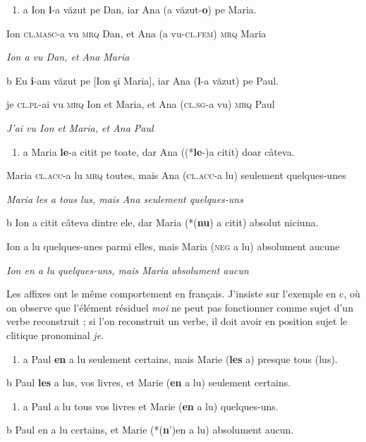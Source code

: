 \begin{enumerate}
\item \label{bkm:Ref289809725}a  Ion \textbf{l}-a văzut pe Dan, iar Ana (a văzut-\textbf{o}) pe Maria.


\end{enumerate}
Ion \textsc{cl.masc-}a vu \textsc{mrq} Dan, et Ana (a vu-\textsc{cl.fem) mrq} Maria

{\itshape
Ion a vu Dan, et Ana Maria}

  b  Eu \textbf{i}-am văzut pe [Ion şi Maria], iar Ana (\textbf{l}-a văzut) pe Paul.

    je \textsc{cl.pl-}ai vu \textsc{mrq} Ion et Maria, et Ana (\textsc{cl.sg}-a vu\textsc{) mrq} Paul

{\itshape
J'ai vu Ion et Maria, et Ana Paul}


\begin{enumerate}
\item \label{bkm:Ref289809793}a  Maria \textbf{le}-a citit pe toate, dar Ana ((*\textbf{le}-)a citit) doar câteva.


\end{enumerate}
Maria \textsc{cl.acc-}a lu \textsc{mrq} toutes, mais Ana (\textsc{cl.acc-}a lu) seulement quelques-unes

{\itshape
Maria les a tous lus, mais Ana seulement quelques-uns}

  b  Ion a citit câteva dintre ele, dar Maria (*(\textbf{nu}) a citit) absolut niciuna.

    Ion a lu quelques-unes parmi elles, mais Maria (\textsc{neg} a lu) absolument aucune

{\itshape
Ion en a lu quelques-uns, mais Maria absolument aucun} 

Les affixes ont le même comportement en français. J'insiste sur l'exemple en c, où on observe que l'élément résiduel \textit{moi} ne peut pas fonctionner comme sujet d'un verbe reconstruit ; si l'on reconstruit un verbe, il doit avoir en position sujet le clitique pronominal \textit{je}.


\begin{enumerate}
\item a   Paul \textbf{en} a lu seulement certains, mais Marie (\textbf{les} a) presque tous (lus).      


\end{enumerate}
b  Paul \textbf{les} a lus, vos livres, et Marie (\textbf{en} a lu) seulement certains.      


\begin{enumerate}
\item \label{bkm:Ref289810105}a   Paul a lu tous vos livres et Marie (\textbf{en} a lu) quelques-uns.      


\end{enumerate}
  b  Paul en a lu certains, et Marie (*(\textbf{n}')en a lu) absolument aucun.


